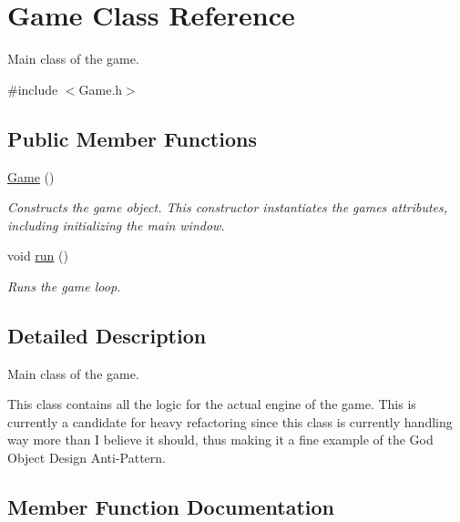 \hypertarget{classGame}{}\section{Game Class Reference}
\label{classGame}


Main class of the game.  




{\ttfamily \#include $<$Game.\+h$>$}

\subsection*{Public Member Functions}
\begin{DoxyCompactItemize}
\item 
\mbox{\label{classGame_ad59df6562a58a614fda24622d3715b65}} 
\mbox{\hyperlink{classGame_ad59df6562a58a614fda24622d3715b65}{Game}} ()
\begin{DoxyCompactList}\small\item\em Constructs the game object. This constructor instantiates the game\textquotesingle{}s attributes, including initializing the main window. \end{DoxyCompactList}\item 
void \mbox{\hyperlink{classGame_a1ab78f5ed0d5ea879157357cf2fb2afa}{run}} ()
\begin{DoxyCompactList}\small\item\em Runs the game loop. \end{DoxyCompactList}\end{DoxyCompactItemize}


\subsection{Detailed Description}
Main class of the game. 

This class contains all the logic for the actual engine of the game. This is currently a candidate for heavy refactoring since this class is currently handling way more than I believe it should, thus making it a fine example of the God Object Design Anti-\/\+Pattern. 

\subsection{Member Function Documentation}
\mbox{\label{classGame_a1ab78f5ed0d5ea879157357cf2fb2afa}} 
